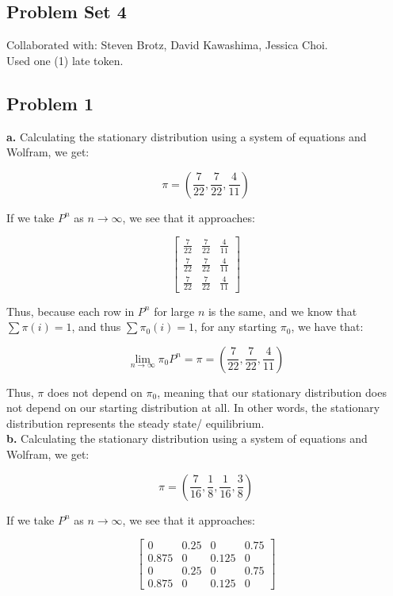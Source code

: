 \documentclass[12 pt]{article}
\begin{document}
	\begin{center}
		\section*{Problem Set 4}
	\end{center}
	
	\noindent Collaborated with: Steven Brotz, David Kawashima, Jessica Choi. \\
	\noindent Used one (1) late token. \\
	
	\subsection*{Problem 1}
	\noindent \textbf{a.} Calculating the stationary distribution using a system of equations
	and Wolfram, we get:
	
	\[\pi = (\frac{7}{22}, \frac{7}{22}, \frac{4}{11})\]
	
	\noindent If we take $P^n$ as $n \rightarrow \infty$, we see that it approaches: 

	\[\begin{bmatrix}
	\frac{7}{22} & \frac{7}{22} & \frac{4}{11} \\
	\frac{7}{22} & \frac{7}{22} &  \frac{4}{11} \\
	\frac{7}{22} & \frac{7}{22} &  \frac{4}{11}
	\end{bmatrix}
	\]
	
	\noindent Thus, because each row in $P^n$ for large $n$ is the same, and we know that $\sum \pi (i) = 1$, and thus $\sum \pi_0 (i) = 1$, for any starting $\pi_0$, we have that: 
	
	\[\lim_{n \rightarrow \infty} \pi_0 P^n = \pi = (\frac{7}{22}, \frac{7}{22}, \frac{4}{11})\]
	
	\noindent Thus, $\pi$ does not depend on $\pi_0$, meaning that our stationary distribution does not depend on our starting distribution at all. In other words, the stationary distribution represents the steady state/ equilibrium. \\
	
	\noindent \textbf{b.} Calculating the stationary distribution using a system of equations
	and Wolfram, we get:
	
	\[\pi = (\frac{7}{16}, \frac{1}{8}, \frac{1}{16}, \frac{3}{8})\]
	
	\noindent If we take $P^n$ as $n \rightarrow \infty$, we see that it approaches: 
	
	\[\begin{bmatrix}
	0 & 0.25 & 0 & 0.75 \\
	0.875 & 0 & 0.125 & 0 \\
	0 & 0.25 & 0 & 0.75 \\
	0.875 & 0 & 0.125 & 0
	\end{bmatrix}
	\]
	
\end{document}
